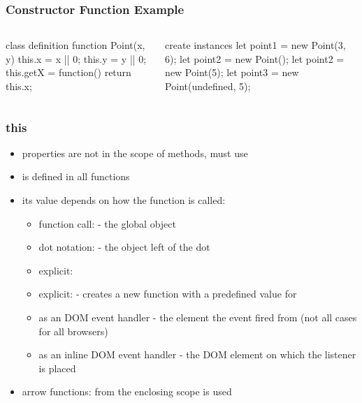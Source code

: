 \begin{frame}[fragile] \frametitle{Constructor Function Example}

\begin{columns}[onlytextwidth]
  \begin{column}{0.5\textwidth}
\begin{CodeBox}{class definition}
function Point(x, y) {
  this.x = x || 0;
  this.y = y || 0;
  this.getX = function() {
    return this.x;
  }
}
\end{CodeBox}
  \end{column}
  \begin{column}{0.5\textwidth}
\begin{CodeBox}{create instances}
let point1 = new Point(3, 6);
let point2 = new Point();
let point2 = new Point(5);
let point3 = 
  new Point(undefined, 5);
\end{CodeBox}
  \end{column}
\end{columns}%
\end{frame}

\begin{frame}[fragile] \frametitle{this}
\begin{itemize}
  \item properties are not in the scope of methods, must use 
  \item {} is defined in all functions
  \item its value depends on how the function is called:
  \begin{itemize}
    \item function call:  - the global object
    \item dot notation:  - the object left of the dot
    \item explicit: 
    \item explicit:  - creates a new function with a predefined value for 
    \item as an DOM event handler - the element the event fired from (not all cases for all browsers)
    \item as an inline DOM event handler - the DOM element on which the listener is placed
  \end{itemize}
  \item arrow functions:  from the enclosing scope is used
\end{itemize}
\end{frame}

